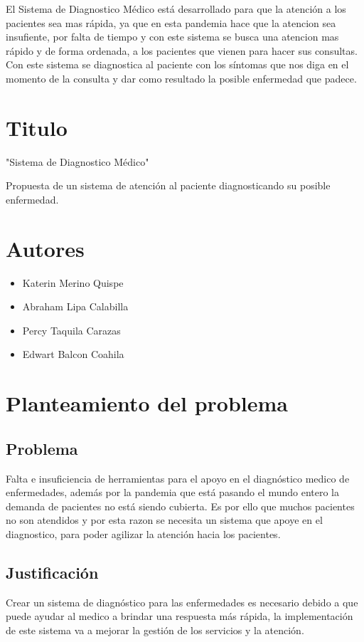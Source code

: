 \documentclass[preprint,12pt,notitlepage]{elsarticle}
\begin{document}
El Sistema de Diagnostico Médico está desarrollado para que la atención a los pacientes sea mas rápida, ya que en esta pandemia hace que la atencion sea insufiente, por falta de tiempo y con este sistema se busca una atencion mas rápido y de forma ordenada, a los pacientes que vienen para hacer sus consultas. Con este sistema se diagnostica al paciente con los síntomas que nos diga en el momento de la consulta y dar como resultado la posible enfermedad que padece.

\section{Titulo}
"Sistema de Diagnostico Médico"

Propuesta de un sistema de atención al paciente diagnosticando su posible enfermedad.
\section{Autores}
\begin{itemize}
    \item Katerin Merino Quispe
    \item Abraham Lipa Calabilla
    \item Percy Taquila Carazas
    \item Edwart Balcon Coahila
    
\end{itemize}
\section{Planteamiento del problema}
	\subsection{\textbf{Problema}}
Falta e insuficiencia de herramientas para el apoyo en el diagnóstico medico de enfermedades, además por la pandemia que está pasando el mundo entero la demanda de pacientes no está siendo cubierta. Es por ello que muchos pacientes no son atendidos y por esta razon se necesita un sistema que apoye en el diagnostico, para poder agilizar la atención hacia los pacientes.
	\subsection{\textbf{Justificación }}
Crear un sistema de diagnóstico para las enfermedades es necesario debido a que puede ayudar al medico a brindar una respuesta más rápida, la implementación de este sistema va a mejorar la gestión de los servicios y la atención.
\end{document}

